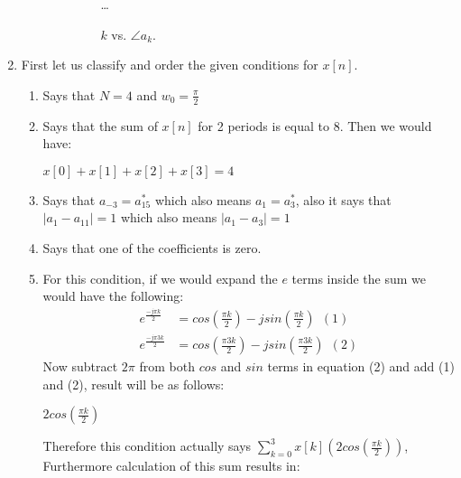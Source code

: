 \documentclass[10pt,a4paper, margin=1in]{article}
\begin{document}
\begin{enumerate}
\begin{enumerate}
\begin{enumerate}
\begin{figure}[H]
    \ldots
    \caption{$k$ vs. $\angle a_k$.}
    \label{fig:q1_b2}
\end{figure}
		\end{enumerate}
	\end{enumerate}	   
\item 
	First let us classify and order the given conditions for $x[n]$.
	\begin{enumerate}
		\item Says that $N=4$ and $w_0=\frac{\pi}{2}$
		\item Says that the sum of $x[n]$ for 2 periods is equal to 8. Then we would have:
			\begin{center}
			$x[0] + x[1] + x[2] + x[3] = 4$ \\
		 	\end{center}
		 \item Says that $a_{-3}=a^{*}_{15}$ which also means $a_1=a^{*}_3$, also it says that $|a_1-a_{11}|=1$ which also means $|a_1-a_3|=1$
		 \item Says that one of the coefficients is zero.
		 \item For this condition, if we would expand the $e$ terms inside the sum we would have the following:
		 	\begin{align*}
		 	e^{\frac{-j\pi k}{2}} &= cos(\frac{\pi k}{2}) -jsin(\frac{\pi k}{2}) \ \ (1)\\
		 	e^{\frac{-j\pi 3k}{2}} &= cos(\frac{\pi 3k}{2}) -jsin(\frac{\pi 3k}{2}) \ \ (2)
		 	\end{align*}
		 	Now subtract $2\pi$ from both $cos$ and $sin$ terms in equation (2) and add (1) and (2), result will be as follows:
		 	\begin{center}
		 	$2cos(\frac{\pi k}{2})$\\
		 	\end{center}
		 	Therefore this condition actually says $\sum_{k=0}^{3} x[k](2cos(\frac{\pi k}{2}))$, Furthermore calculation of this sum results in:

\end{enumerate}
\end{enumerate}
\end{document}
